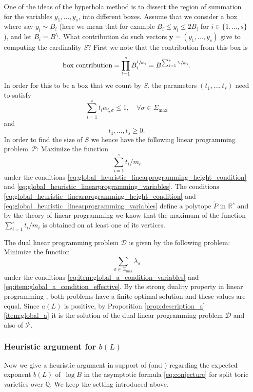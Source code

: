 \documentclass[11pt]{article}
\numberwithin{equation}{section}
\newcommand{\bfy}{\boldsymbol{y}}
\newcommand\RR{\mathbb{R}}
\newcommand\QQ{\mathbb{Q}}
\theoremstyle{definition}
\numberwithin{theorem}{section}
\begin{document}
One of the ideas of the hyperbola method is to dissect the region of summation for the variables $y_1,\dots,y_s$, into different boxes. Assume that we consider a box where say $y_i \sim B_i$ (here we mean that for example $B_i\leq y_i\leq 2B_i$ for $i\in\{1,\dots,s\}$), and let $B_i=B^{t_i}$. What contribution do such vectors $\bfy=(y_1,\dots,y_s)$ give to computing the cardinality $S$? First we note that the contribution from this box is
\[
\text{box contribution} = \prod_{i=1}^sB_i^{\sfrac 1{m_i}}=B^{\sum_{i=1}^s \sfrac{t_i}{m_i} }.
\]
In order for this to be a box that we count by $S$, the parameters $(t_1,\dots,t_s)$ need to satisfy
\begin{equation}
\label{eq:global_heuristic_linearprogramming_height_condition}
\sum_{i=1}^s t_i \alpha_{i,\sigma}\leq 1, \quad \forall \sigma\in\Sigma_{\max}
\end{equation}
and
\begin{equation}
\label{eq:global_heuristic_linearprogramming_variables}
t_1,\dots,t_s\geq0.
\end{equation}
In order to find the size of $S$ we hence have the following linear programming problem~$\mathcal{P}$:
Maximize the function
\begin{equation}
\label{eq:maximize_global_function}
\sum_{i=1}^s t_i/m_i
\end{equation}
under the conditions \eqref{eq:global_heuristic_linearprogramming_height_condition} and \eqref{eq:global_heuristic_linearprogramming_variables}.
The conditions \eqref{eq:global_heuristic_linearprogramming_height_condition} and \eqref{eq:global_heuristic_linearprogramming_variables} define a polytope $\widetilde P$ in $\RR^s$ and by the theory of linear programming we know that the maximum of the function $\sum_{i=1}^s t_i/m_i$ is obtained on at least one of its vertices.

The dual linear programming problem $\mathcal{D}$ is given by the following problem:
Minimize the function
\[
\sum_{\sigma\in\Sigma_{\max}}\lambda_\sigma
\]
under the conditions \eqref{eq:item:global_a_condition_variables} and \eqref{eq:item:global_a_condition_effective}.
By the strong duality property in linear programming \cite[Ch.\,6]{Dantzig}, both problems have a finite optimal solution and these values are equal. Since $a(L)$ is positive, by Proposition \ref{prop:description_a}\eqref{item:global_a} it is the solution of the dual linear programming problem $\mathcal{D}$ and also of $\mathcal{P}$.

\subsubsection{Heuristic argument for $b(L)$}
Now we give a heuristic argument in support of \cite[Conj.\,1.1]{PSTVA}
(and \cite[\S3.3]{MR1032922})
regarding the expected exponent $b(L)$ of~$\log B$ in the asymptotic
formula \eqref{eq:conjecture} for split toric varieties over $\QQ$.
We keep the setting introduced above.
\end{document}
